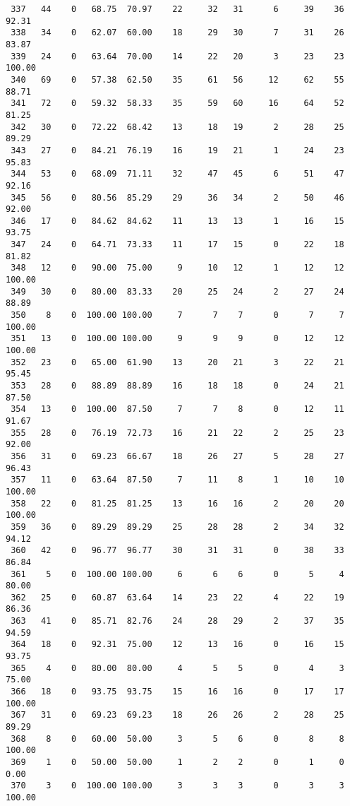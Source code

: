 \begin{verbatim}
 337   44    0   68.75  70.97    22     32   31      6     39    36    92.31
 338   34    0   62.07  60.00    18     29   30      7     31    26    83.87
 339   24    0   63.64  70.00    14     22   20      3     23    23   100.00
 340   69    0   57.38  62.50    35     61   56     12     62    55    88.71
 341   72    0   59.32  58.33    35     59   60     16     64    52    81.25
 342   30    0   72.22  68.42    13     18   19      2     28    25    89.29
 343   27    0   84.21  76.19    16     19   21      1     24    23    95.83
 344   53    0   68.09  71.11    32     47   45      6     51    47    92.16
 345   56    0   80.56  85.29    29     36   34      2     50    46    92.00
 346   17    0   84.62  84.62    11     13   13      1     16    15    93.75
 347   24    0   64.71  73.33    11     17   15      0     22    18    81.82
 348   12    0   90.00  75.00     9     10   12      1     12    12   100.00
 349   30    0   80.00  83.33    20     25   24      2     27    24    88.89
 350    8    0  100.00 100.00     7      7    7      0      7     7   100.00
 351   13    0  100.00 100.00     9      9    9      0     12    12   100.00
 352   23    0   65.00  61.90    13     20   21      3     22    21    95.45
 353   28    0   88.89  88.89    16     18   18      0     24    21    87.50
 354   13    0  100.00  87.50     7      7    8      0     12    11    91.67
 355   28    0   76.19  72.73    16     21   22      2     25    23    92.00
 356   31    0   69.23  66.67    18     26   27      5     28    27    96.43
 357   11    0   63.64  87.50     7     11    8      1     10    10   100.00
 358   22    0   81.25  81.25    13     16   16      2     20    20   100.00
 359   36    0   89.29  89.29    25     28   28      2     34    32    94.12
 360   42    0   96.77  96.77    30     31   31      0     38    33    86.84
 361    5    0  100.00 100.00     6      6    6      0      5     4    80.00
 362   25    0   60.87  63.64    14     23   22      4     22    19    86.36
 363   41    0   85.71  82.76    24     28   29      2     37    35    94.59
 364   18    0   92.31  75.00    12     13   16      0     16    15    93.75
 365    4    0   80.00  80.00     4      5    5      0      4     3    75.00
 366   18    0   93.75  93.75    15     16   16      0     17    17   100.00
 367   31    0   69.23  69.23    18     26   26      2     28    25    89.29
 368    8    0   60.00  50.00     3      5    6      0      8     8   100.00
 369    1    0   50.00  50.00     1      2    2      0      1     0     0.00
 370    3    0  100.00 100.00     3      3    3      0      3     3   100.00

\end{verbatim}
